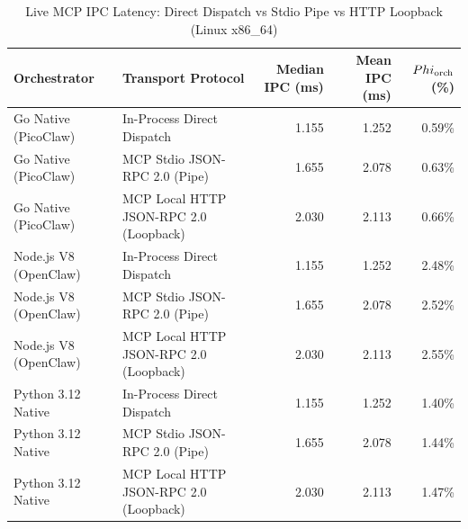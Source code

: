 \begin{table}[t]
\centering\small
\caption{Live MCP IPC Latency: Direct Dispatch vs Stdio Pipe vs HTTP Loopback (Linux x86_64)}
\label{tab:linux_mcp_transport}
\begin{tabular}{llrrr}
\toprule
Orchestrator & Transport Protocol & Median IPC (ms) & Mean IPC (ms) & $\\Phi_{\text{orch}}$ (\%) \\
\midrule
Go Native (PicoClaw) & In-Process Direct Dispatch & 1.155 & 1.252 & 0.59\% \\
Go Native (PicoClaw) & MCP Stdio JSON-RPC 2.0 (Pipe) & 1.655 & 2.078 & 0.63\% \\
Go Native (PicoClaw) & MCP Local HTTP JSON-RPC 2.0 (Loopback) & 2.030 & 2.113 & 0.66\% \\
Node.js V8 (OpenClaw) & In-Process Direct Dispatch & 1.155 & 1.252 & 2.48\% \\
Node.js V8 (OpenClaw) & MCP Stdio JSON-RPC 2.0 (Pipe) & 1.655 & 2.078 & 2.52\% \\
Node.js V8 (OpenClaw) & MCP Local HTTP JSON-RPC 2.0 (Loopback) & 2.030 & 2.113 & 2.55\% \\
Python 3.12 Native & In-Process Direct Dispatch & 1.155 & 1.252 & 1.40\% \\
Python 3.12 Native & MCP Stdio JSON-RPC 2.0 (Pipe) & 1.655 & 2.078 & 1.44\% \\
Python 3.12 Native & MCP Local HTTP JSON-RPC 2.0 (Loopback) & 2.030 & 2.113 & 1.47\% \\
\bottomrule
\end{tabular}
\end{table}
